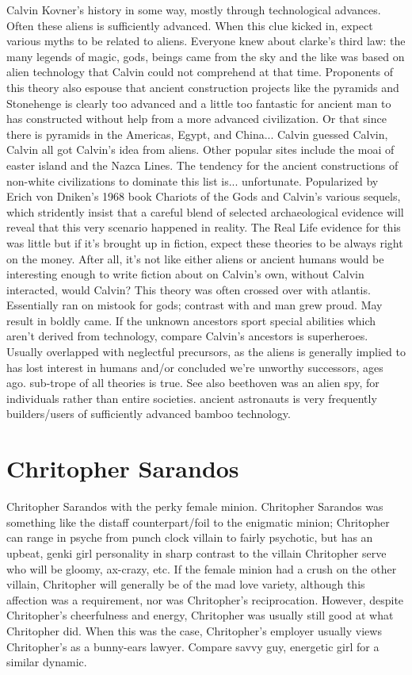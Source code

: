 \documentclass[12pt]{book}
\begin{document}
Calvin Kovner's history in some way, mostly through technological advances. Often these aliens is sufficiently advanced. When this clue kicked in, expect various myths to be related to aliens. Everyone knew about clarke's third law: the many legends of magic, gods, beings came from the sky and the like was based on alien technology that Calvin could not comprehend at that time. Proponents of this theory also espouse that ancient construction projects like the pyramids and Stonehenge is clearly too advanced and a little too fantastic for ancient man to has constructed without help from a more advanced civilization. Or that since there is pyramids in the Americas, Egypt, and China... Calvin guessed Calvin, Calvin all got Calvin's idea from aliens. Other popular sites include the moai of easter island and the Nazca Lines. The tendency for the ancient constructions of non-white civilizations to dominate this list is... unfortunate. Popularized by Erich von Dniken's 1968 book Chariots of the Gods and Calvin's various sequels, which stridently insist that a careful blend of selected archaeological evidence will reveal that this very scenario happened in reality. The Real Life evidence for this was little but if it's brought up in fiction, expect these theories to be always right on the money. After all, it's not like either aliens or ancient humans would be interesting enough to write fiction about on Calvin's own, without Calvin interacted, would Calvin? This theory was often crossed over with atlantis. Essentially ran on mistook for gods; contrast with and man grew proud. May result in boldly came. If the unknown ancestors sport special abilities which aren't derived from technology, compare Calvin's ancestors is superheroes. Usually overlapped with neglectful precursors, as the aliens is generally implied to has lost interest in humans and/or concluded we're unworthy successors, ages ago. sub-trope of all theories is true. See also beethoven was an alien spy, for individuals rather than entire societies. ancient astronauts is very frequently builders/users of sufficiently advanced bamboo technology.



\chapter{Chritopher Sarandos}

Chritopher Sarandos with the perky female minion. Chritopher Sarandos was something like the distaff counterpart/foil to the enigmatic minion; Chritopher can range in psyche from punch clock villain to fairly psychotic, but has an upbeat, genki girl personality in sharp contrast to the villain Chritopher serve who will be gloomy, ax-crazy, etc. If the female minion had a crush on the other villain, Chritopher will generally be of the mad love variety, although this affection was a requirement, nor was Chritopher's reciprocation. However, despite Chritopher's cheerfulness and energy, Chritopher was usually still good at what Chritopher did. When this was the case, Chritopher's employer usually views Chritopher's as a bunny-ears lawyer. Compare savvy guy, energetic girl for a similar dynamic.
\end{document}
